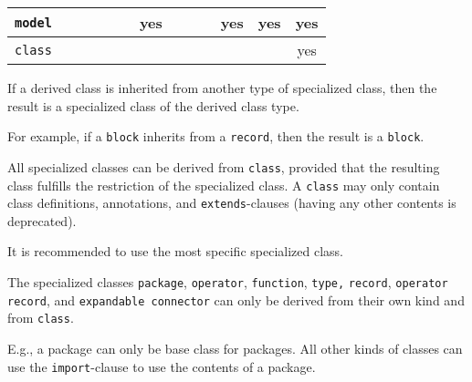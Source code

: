 \begin{center}
{\begin{tabular}{|c||c|c|c|c|c|c|c|c|c|c|c|c|}
    \hline
    {\lstinline!model!}             &                          &                           &                                            &                      &                          & \cellcolor{lightgray}yes &                          &                          &                            & \cellcolor{lightgray}yes & yes                    & \cellcolor{lightgray}yes                   \\
    \hline
    {\lstinline!class!}             &                          &                           &                                            &                      &                          &                          &                          &                          &                            &                          &                        & yes                                        \\
    \hline
\end{tabular}
\ifpdf}\else\fi%
\end{center}

If a derived class is inherited from another type of specialized class, then the result is a specialized class of the derived class type.

\begin{nonnormative}
For example, if a \lstinline!block! inherits from a \lstinline!record!, then the result is a \lstinline!block!.
\end{nonnormative}

All specialized classes can be derived from \lstinline!class!, provided that the resulting class fulfills the restriction of the specialized class.
A \lstinline!class! may only contain class definitions, annotations, and \lstinline!extends!-clauses (having any other contents is deprecated).

\begin{nonnormative}
It is recommended to use the most specific specialized class.
\end{nonnormative}

The specialized classes \lstinline!package!, \lstinline!operator!, \lstinline!function!, \lstinline!type,! \lstinline!record!, \lstinline!operator record!, and \lstinline!expandable connector! can only be derived from their own kind and from \lstinline!class!.

\begin{nonnormative}
E.g., a package can only be base class for packages.
All other kinds of classes can use the \lstinline!import!-clause to use the contents of a package.
\end{nonnormative}

